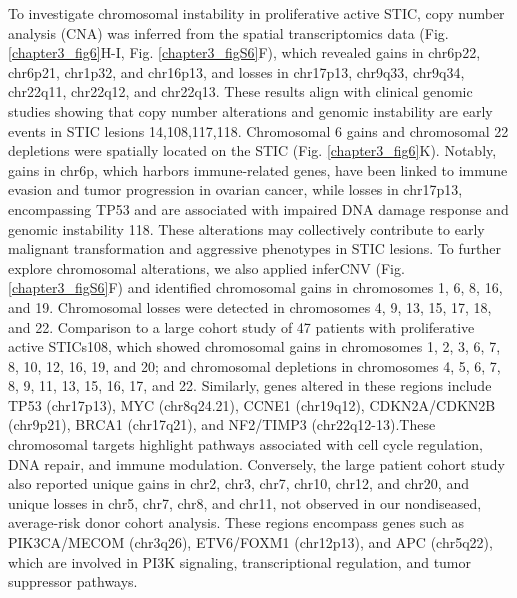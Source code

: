 \begin{refsection}
    To investigate chromosomal instability in proliferative active STIC, copy number analysis (CNA) was inferred from the spatial transcriptomics data (Fig. \ref{chapter3_fig6}H-I, Fig. \ref{chapter3_figS6}F), which revealed gains in chr6p22, chr6p21, chr1p32, and chr16p13, and losses in chr17p13, chr9q33, chr9q34, chr22q11, chr22q12, and chr22q13. These results align with clinical genomic studies showing that copy number alterations and genomic instability are early events in STIC lesions\cite{Wu2019Genomic,Chang2025Integrated,Devlin1996High,Zhakula2024Patterns} 14,108,117,118. Chromosomal 6 gains and chromosomal 22 depletions were spatially located on the STIC (Fig. \ref{chapter3_fig6}K). Notably, gains in chr6p, which harbors immune-related genes, have been linked to immune evasion and tumor progression in ovarian cancer, while losses in chr17p13, encompassing TP53 and are associated with impaired DNA damage response and genomic instability \cite{Zhakula2024Patterns}118. These alterations may collectively contribute to early malignant transformation and aggressive phenotypes in STIC lesions. 
    To further explore chromosomal alterations, we also applied inferCNV (Fig. \ref{chapter3_figS6}F) and identified chromosomal gains in chromosomes 1, 6, 8, 16, and 19. Chromosomal losses were detected in chromosomes 4, 9, 13, 15, 17, 18, and 22.  Comparison to a large cohort study of 47 patients with proliferative active STICs\cite{Chang2025Integrated}108, which showed chromosomal gains in chromosomes 1, 2, 3, 6, 7, 8, 10, 12, 16, 19, and 20; and chromosomal depletions in chromosomes 4, 5, 6, 7, 8, 9, 11, 13, 15, 16, 17, and 22. Similarly, genes altered in these regions include TP53 (chr17p13), MYC (chr8q24.21), CCNE1 (chr19q12), CDKN2A/CDKN2B (chr9p21), BRCA1 (chr17q21), and NF2/TIMP3 (chr22q12-13).These chromosomal targets highlight pathways associated with cell cycle regulation, DNA repair, and immune modulation. Conversely, the large patient cohort study also reported unique gains in chr2, chr3, chr7, chr10, chr12, and chr20, and unique losses in chr5, chr7, chr8, and chr11, not observed in our nondiseased, average-risk donor cohort analysis. These regions encompass genes such as PIK3CA/MECOM (chr3q26), ETV6/FOXM1 (chr12p13), and APC (chr5q22), which are involved in PI3K signaling, transcriptional regulation, and tumor suppressor pathways. 


\end{refsection}
